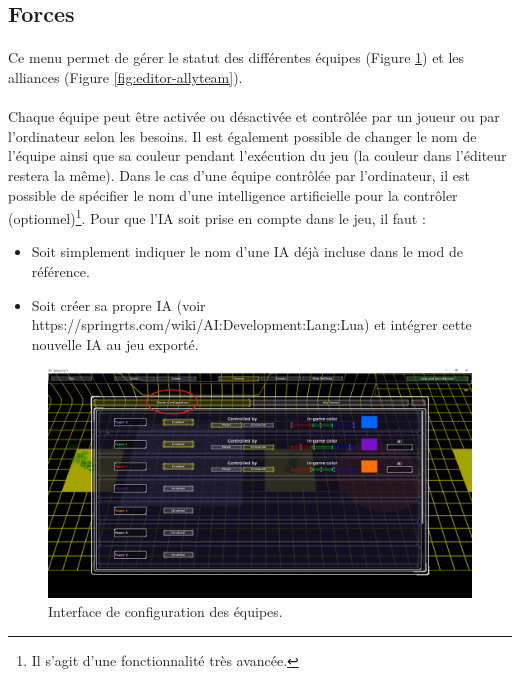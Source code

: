 \documentclass[a4paper]{article}
\begin{document}
\subsection{Forces}
\paragraph{ }
Ce menu permet de gérer le statut des différentes équipes (Figure \ref{fig:editor-teamconfig}) et les alliances (Figure \ref{fig:editor-allyteam}).
\paragraph{ }
Chaque équipe peut être activée ou désactivée et contrôlée par un joueur ou par l'ordinateur selon les besoins. Il est également possible de changer le nom de l'équipe ainsi que sa couleur pendant l'exécution du jeu (la couleur dans l'éditeur restera la même). Dans le cas d'une équipe contrôlée par l'ordinateur, il est possible de spécifier le nom d'une intelligence artificielle pour la contrôler (optionnel)\footnote{Il s'agit d'une fonctionnalité très avancée.}. Pour que l'IA soit prise en compte dans le jeu, il faut :
\begin{itemize}
\item Soit simplement indiquer le nom d'une IA déjà incluse dans le mod de référence.
\item Soit créer sa propre IA (voir https://springrts.com/wiki/AI:Development:Lang:Lua) et intégrer cette nouvelle IA au jeu exporté.
\end{itemize}
\begin{figure}[H]
\centering
\includegraphics[width=\linewidth]{editor-teamconfig.png}
\caption{Interface de configuration des équipes.}
\label{fig:editor-teamconfig}
\end{figure}
\end{document}
